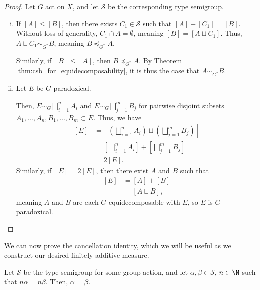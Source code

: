 \begin{proof}
  Let $G$ act on $X$, and let $\mathcal{S}$ be the corresponding type semigroup.
  \begin{enumerate}[(i)]
    \item If $\left[A\right]\leq \left[B\right]$, then there exists $C_1\in \mathcal{S}$ such that $\left[A\right] + \left[C_1\right] = \left[B\right]$. Without loss of generality, $C_1\cap A= \emptyset$, meaning $\left[B\right] = \left[A\sqcup C_1\right]$. Thus, $A\sqcup C_1 \sim_{G^{\ast}} B$, meaning $B\preceq_{G^{\ast}}A$.\newline

      Similarly, if $\left[B\right]\leq \left[A\right]$, then $B\preceq_{G^{\ast}}A$. By Theorem \ref{thm:csb_for_equidecomposability}, it is thus the case that $A\sim_{G^{\ast}}B$.
    \item Let $E$ be $G$-paradoxical. \newline

      Then, $E\sim_{G}\bigsqcup_{i=1}^{n}A_i$ and $E \sim_{G}\bigsqcup_{j=1}^{m}B_j$ for pairwise disjoint subsets $A_1,\dots,A_n,B_1,\dots,B_m\subset E$. Thus, we have
      \begin{align*}
        \left[E\right] &= \left[\left(\bigsqcup_{i=1}^{n}A_i\right)\sqcup \left(\bigsqcup_{j=1}^{m}B_j\right)\right]\\
                       &= \left[\bigsqcup_{i=1}^{n}A_i\right] + \left[\bigsqcup_{j=1}^{m}B_j\right]\\
                       &= 2\left[E\right].
      \end{align*}
      Similarly, if $\left[E\right] = 2\left[E\right]$, then there exist $A$ and $B$ such that
      \begin{align*}
        \left[E\right] &= \left[A\right] + \left[B\right]\\
                       &= \left[A\sqcup B\right],
      \end{align*}
      meaning $A$ and $B$ are each $G$-equidecomposable with $E$, so $E$ is $G$-paradoxical.
  \end{enumerate}
\end{proof}
We can now prove the cancellation identity, which we will be useful as we construct our desired finitely additive measure.
\begin{theorem}
  Let $\mathcal{S}$ be the type semigroup for some group action, and let $\alpha,\beta\in \mathcal{S}$, $n\in \N$ such that $n\alpha = n\beta$. Then, $\alpha = \beta$.
\end{theorem}
